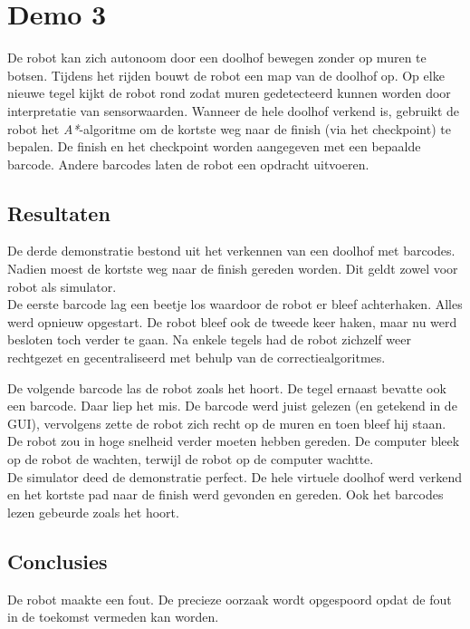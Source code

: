 \documentclass[eind]{penoverslag}
\begin{document}
\section{Demo 3} %
\label{Asec:demo3}
De robot kan zich autonoom door een doolhof bewegen zonder op muren te botsen. Tijdens het rijden bouwt de robot een map van de doolhof op. Op elke nieuwe tegel kijkt de robot rond zodat muren gedetecteerd kunnen worden door interpretatie van sensorwaarden. Wanneer de hele doolhof verkend is, gebruikt de robot het \textit{A*}-algoritme om de kortste weg naar de finish (via het checkpoint) te bepalen. De finish en het checkpoint worden aangegeven met een bepaalde barcode. Andere barcodes laten de robot een opdracht uitvoeren.

\subsection{Resultaten} %
\label{Assec:result3}
De derde demonstratie bestond uit het verkennen van een doolhof met barcodes. Nadien moest de kortste weg naar de finish gereden worden. Dit geldt zowel voor robot als simulator.\\

De eerste barcode lag een beetje los waardoor de robot er bleef achterhaken. Alles werd opnieuw opgestart. De robot bleef ook de tweede keer haken, maar nu werd besloten toch verder te gaan. Na enkele tegels had de robot zichzelf weer rechtgezet en gecentraliseerd met behulp van de correctiealgoritmes.

De volgende barcode las de robot zoals het hoort. De tegel ernaast bevatte ook een barcode. Daar liep het mis. De barcode werd juist gelezen (en getekend in de GUI), vervolgens zette de robot zich recht op de muren en toen bleef hij staan. De robot zou in hoge snelheid verder moeten hebben gereden. De computer bleek op de robot de wachten, terwijl de robot op de computer wachtte.\\

De simulator deed de demonstratie perfect. De hele virtuele doolhof werd verkend en het kortste pad naar de finish werd gevonden en gereden. Ook het barcodes lezen gebeurde zoals het hoort.

\subsection{Conclusies} %
\label{Assec:conc3}
De robot maakte een fout. De precieze oorzaak wordt opgespoord opdat de fout in de toekomst vermeden kan worden.
\end{document}
